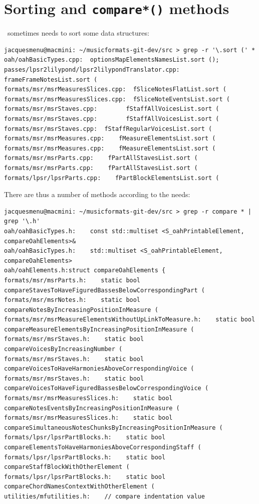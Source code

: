 \section{Sorting and {\tt compare*()} methods}

\mf\ sometimes needs to sort some data structures:
\begin{lstlisting}[language=Terminal]
jacquesmenu@macmini: ~/musicformats-git-dev/src > grep -r '\.sort (' *
oah/oahBasicTypes.cpp:  optionsMapElementsNamesList.sort ();
passes/lpsr2lilypond/lpsr2lilypondTranslator.cpp:    frameFrameNotesList.sort (
formats/msr/msrMeasuresSlices.cpp:  fSliceNotesFlatList.sort (
formats/msr/msrMeasuresSlices.cpp:  fSliceNoteEventsList.sort (
formats/msr/msrStaves.cpp:        fStaffAllVoicesList.sort (
formats/msr/msrStaves.cpp:        fStaffAllVoicesList.sort (
formats/msr/msrStaves.cpp:  fStaffRegularVoicesList.sort (
formats/msr/msrMeasures.cpp:    fMeasureElementsList.sort (
formats/msr/msrMeasures.cpp:    fMeasureElementsList.sort (
formats/msr/msrParts.cpp:    fPartAllStavesList.sort (
formats/msr/msrParts.cpp:    fPartAllStavesList.sort (
formats/lpsr/lpsrParts.cpp:    fPartBlockElementsList.sort (
\end{lstlisting}

There are thus a number of  methods according to the needs:
\begin{lstlisting}[language=Terminal]
jacquesmenu@macmini: ~/musicformats-git-dev/src > grep -r compare * | grep '\.h'
oah/oahBasicTypes.h:    const std::multiset <S_oahPrintableElement, compareOahElements>&
oah/oahBasicTypes.h:    std::multiset <S_oahPrintableElement, compareOahElements>
oah/oahElements.h:struct compareOahElements {
formats/msr/msrParts.h:    static bool           compareStavesToHaveFiguredBassesBelowCorrespondingPart (
formats/msr/msrNotes.h:    static bool           compareNotesByIncreasingPositionInMeasure (
formats/msr/msrMeasureElementsWithoutUpLinkToMeasure.h:    static bool           compareMeasureElementsByIncreasingPositionInMeasure (
formats/msr/msrStaves.h:    static bool           compareVoicesByIncreasingNumber (
formats/msr/msrStaves.h:    static bool           compareVoicesToHaveHarmoniesAboveCorrespondingVoice (
formats/msr/msrStaves.h:    static bool           compareVoicesToHaveFiguredBassesBelowCorrespondingVoice (
formats/msr/msrMeasuresSlices.h:    static bool           compareNotesEventsByIncreasingPositionInMeasure (
formats/msr/msrMeasuresSlices.h:    static bool           compareSimultaneousNotesChunksByIncreasingPositionInMeasure (
formats/lpsr/lpsrPartBlocks.h:    static bool           compareElementsToHaveHarmoniesAboveCorrespondingStaff (
formats/lpsr/lpsrPartBlocks.h:    static bool           compareStaffBlockWithOtherElement (
formats/lpsr/lpsrPartBlocks.h:    static bool           compareChordNamesContextWithOtherElement (
utilities/mfutilities.h:    // compare indentation value
\end{lstlisting}

